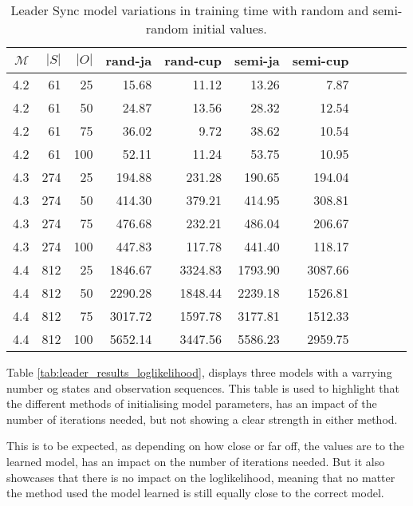 \begin{table}[htb!]
    \centering
    \caption{Leader Sync model variations in training time with random and semi-random initial values.}
    \label{tab:leader_results_rand_vs_semi}
    \begin{tabular}{rrrrrrrrrrr}
        \toprule
        $\mathcal{M}$ & $|S|$ & $|O|$ & rand-ja & rand-cup & semi-ja & semi-cup \\
        \midrule
        4.2           & 61    & 25    & 15.68   & 11.12    & 13.26   & 7.87     \\
        4.2           & 61    & 50    & 24.87   & 13.56    & 28.32   & 12.54    \\
        4.2           & 61    & 75    & 36.02   & 9.72     & 38.62   & 10.54    \\
        4.2           & 61    & 100   & 52.11   & 11.24    & 53.75   & 10.95    \\
        4.3           & 274   & 25    & 194.88  & 231.28   & 190.65  & 194.04   \\
        4.3           & 274   & 50    & 414.30  & 379.21   & 414.95  & 308.81   \\
        4.3           & 274   & 75    & 476.68  & 232.21   & 486.04  & 206.67   \\
        4.3           & 274   & 100   & 447.83  & 117.78   & 441.40  & 118.17   \\
        4.4           & 812   & 25    & 1846.67 & 3324.83  & 1793.90 & 3087.66  \\
        4.4           & 812   & 50    & 2290.28 & 1848.44  & 2239.18 & 1526.81  \\
        4.4           & 812   & 75    & 3017.72 & 1597.78  & 3177.81 & 1512.33  \\
        4.4           & 812   & 100   & 5652.14 & 3447.56  & 5586.23 & 2959.75  \\
        \bottomrule
    \end{tabular}
\end{table}

Table \autoref{tab:leader_results_loglikelihood}, displays three models with a varrying number og states and observation sequences.
This table is used to highlight that the different methods of initialising model parameters, has an impact of the number of iterations needed, but not showing a clear strength in either method.

This is to be expected, as depending on how close or far off, the values are to the learned model, has an impact on the number of iterations needed.
But it also showcases that there is no impact on the loglikelihood, meaning that no matter the method used the model learned is still equally close to the correct model.

